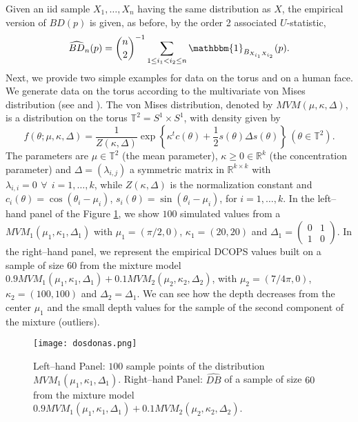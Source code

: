 \documentclass[a4paper]{article}
\numberwithin{equation}{section}
\newcommand{\I}{\mathbbm{1}}
\newcommand{\R}{\mbox{$\mathbb{R}$}}
\begin{document}
Given an iid sample $ X_1, \ldots, X_n$  having the same distribution as  $X$,  the empirical version of  $BD(p)$ is given, as before, by the order 2 associated  $U$-statistic,
\begin{equation}
\widehat{BD}_n(p)= \binom{n}{2}^{-1} \sum_{1 \leq i_1 < i_2 \leq n} \I_{B_{X_{i_1} X_{i_2}}}(p).
\label{estimadorprofundidad_man}
\end{equation}
Next, we provide two simple examples for data on the torus and on a human face. We generate data on the torus  according to the multivariate von Mises distribution (see \cite{mardia2008} and \cite{mardia2014}). The von Mises distribution, denoted by $MVM(\mu,\kappa, \Delta)$, is a distribution on the torus  $\mathbb{T}^2= S^1 \times S^1$, with density given by
\begin{equation}
f(\theta; \mu,\kappa,\Delta)= \frac{1}{Z(\kappa,\Delta)} \exp \left \{  \kappa^t c(\theta) + \frac{1}{2}s(\theta)\Delta s(\theta)  \right \}  \, (\theta \in \mathbb{T}^2).
\end{equation}
The parameters are  $\mu \in \mathbb{T}^2$ (the mean parameter), $\kappa \geq 0 \in \R^k$  (the concentration parameter) and $\Delta= (\lambda_{i,j})$ a symmetric matrix in $\R ^{k \times k}$ with  $\lambda_{i,i} = 0 \, \ \forall \ \ i=1,\ldots,k$, while $Z(\kappa,\Delta)$  is the normalization constant and $c_i(\theta)= \cos(\theta_i - \mu_i)$, $ s_i(\theta)= \sin(\theta_i - \mu_i)$, for $i=1, \ldots,k$. In the left--hand panel of the  Figure \ref{toro}, we show $100$ simulated values from a $MVM_1(\mu_1,\kappa_1, \Delta_1)$ with $\mu_1=(\pi/2,0)$, $\kappa_1=(20,20)$ and  $\Delta_1= \left( \begin{matrix}  0&1 \\ 1 &0\end{matrix}\right)$. In the right--hand panel,  we represent the empirical DCOPS values built on a sample of size $60$ from the mixture model  $0.9 MVM_1(\mu_1,\kappa_1, \Delta_1) + 0.1 MVM_2(\mu_2,\kappa_2, \Delta_2)$, with  $\mu_2=(7/4 \pi,0)$, $\kappa_2=(100,100)$ and  $\Delta_2= \Delta_1$. We can see how the depth decreases from the center $\mu_1$ and the small depth values for the sample of the second component of the mixture (outliers).
\begin{figure}[!ht]
\centering
\texttt{[image: dosdonas.png]}
\caption{Left--hand Panel: $100$ sample points  of the distribution  $MVM_1(\mu_1,\kappa_1, \Delta_1)$. Right--hand Panel: $\widehat{DB}$ of a sample of size $60$ from the mixture model  $0.9 MVM_1(\mu_1,\kappa_1, \Delta_1) + 0.1 MVM_2(\mu_2,\kappa_2,\Delta_2)$.}
\label{toro}  
\end{figure}
\end{document}
